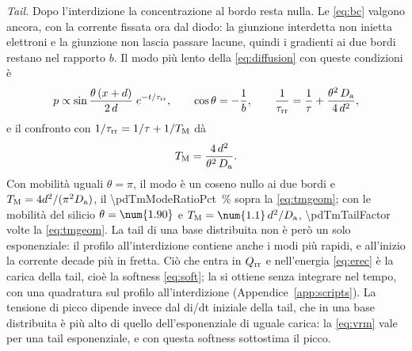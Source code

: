 \documentclass[10pt,a4paper]{scrartcl}
\let\newcommand\pdvaluedefine
\newcommand{\Qrr}{Q_\mathrm{rr}}
\newcommand{\taurr}{\tau_\mathrm{rr}}
\newcommand{\TM}{T_\mathrm{M}}
\newcommand{\Da}{D_\mathrm{a}}
\newcommand{\Pp}{p\textsuperscript{+}}
\newcommand{\Nm}{n\textsuperscript{--}}
\newcommand{\Np}{n\textsuperscript{+}}
\begin{document}
\emph{Tail.} Dopo l'interdizione la concentrazione al bordo \Pp{} resta nulla. Le \eqref{eq:bc} valgono ancora, con la corrente fissata ora dal diodo: la giunzione interdetta non inietta elettroni e la giunzione \Nm\Np{} non lascia passare lacune, quindi i gradienti ai due bordi restano nel rapporto $b$. Il modo più lento della \eqref{eq:diffusion} con queste condizioni è
\begin{equation}
p \propto \sin\frac{\theta\,(x+d)}{2\,d}\;e^{-t/\taurr} , \qquad \cos\theta = -\frac1b , \qquad \frac{1}{\taurr} = \frac1\tau + \frac{\theta^2\,\Da}{4\,d^2} ,
\end{equation}
e il confronto con $1/\taurr = 1/\tau + 1/\TM$ dà
\begin{equation}
\TM = \frac{4\,d^2}{\theta^2\,\Da} .
\label{eq:tmtail}
\end{equation}
Con mobilità uguali $\theta = \pi$, il modo è un coseno nullo ai due bordi e $\TM = 4d^2/(\pi^2\Da)$, il \SI{\pdTmModeRatioPct}{\percent} sopra la \eqref{eq:tmgeom}; con le mobilità del silicio $\theta = \num{\pdTmTailAngle}$ e $\TM = \num{\pdTmTailCoef}\,d^2/\Da$, \num{\pdTmTailFactor} volte la \eqref{eq:tmgeom}. La tail di una base distribuita non è però un solo esponenziale: il profilo all'interdizione contiene anche i modi più rapidi, e all'inizio la corrente decade più in fretta. Ciò che entra in $\Qrr$ e nell'energia \eqref{eq:erec} è la carica della tail, cioè la softness \eqref{eq:soft}; la si ottiene senza integrare nel tempo, con una quadratura sul profilo all'interdizione (Appendice~\ref{app:scripts}). La tensione di picco dipende invece dal di/dt iniziale della tail, che in una base distribuita è più alto di quello dell'esponenziale di uguale carica: la \eqref{eq:vrm} vale per una tail esponenziale, e con questa softness sottostima il picco.
\end{document}
